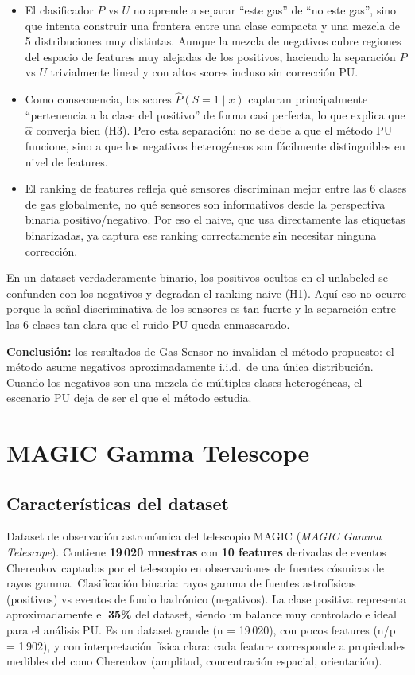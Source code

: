 \documentclass[a4paper,11pt]{article}
\begin{document}
\begin{itemize}
    \item El clasificador $P$ vs $U$ no aprende a separar ``este gas'' de ``no este gas'', sino que intenta construir una frontera entre una clase compacta y una mezcla de 5 distribuciones muy distintas. Aunque la mezcla de negativos cubre regiones del espacio de features muy alejadas de los positivos, haciendo la separación $P$ vs $U$ trivialmente lineal y con altos scores incluso sin corrección PU.
    \item Como consecuencia, los scores $\hat{P}(S=1 \mid x)$ capturan principalmente ``pertenencia a la clase del positivo'' de forma casi perfecta, lo que explica que $\hat{\alpha}$ converja bien (H3). Pero esta separación: no se debe a que el método PU funcione, sino a que los negativos heterogéneos son fácilmente distinguibles en nivel de features.
    \item El ranking de features refleja qué sensores discriminan mejor entre las 6 clases de gas globalmente, no qué sensores son informativos desde la perspectiva binaria positivo/negativo. Por eso el naive, que usa directamente las etiquetas binarizadas, ya captura ese ranking correctamente sin necesitar ninguna corrección.
\end{itemize}

En un dataset verdaderamente binario, los positivos ocultos en el unlabeled se confunden con los negativos y degradan el ranking naive (H1). Aquí eso no ocurre porque la señal discriminativa de los sensores es tan fuerte y la separación entre las 6 clases tan clara que el ruido PU queda enmascarado.

\textbf{Conclusión:} los resultados de Gas Sensor no invalidan el método propuesto: el método asume negativos aproximadamente i.i.d.\ de una única distribución. Cuando los negativos son una mezcla de múltiples clases heterogéneas, el escenario PU deja de ser el que el método estudia.

\section{MAGIC Gamma Telescope}

\subsection{Características del dataset}

Dataset de observación astronómica del telescopio MAGIC (\textit{MAGIC Gamma Telescope}). Contiene \textbf{19\,020 muestras} con \textbf{10 features} derivadas de eventos Cherenkov captados por el telescopio en observaciones de fuentes cósmicas de rayos gamma. Clasificación binaria: rayos gamma de fuentes astrofísicas (positivos) vs eventos de fondo hadrónico (negativos). La clase positiva representa aproximadamente el \textbf{35\%} del dataset, siendo un balance muy controlado e ideal para el análisis PU. Es un dataset grande (n = 19\,020), con pocos features (n/p = 1\,902), y con interpretación física clara: cada feature corresponde a propiedades medibles del cono Cherenkov (amplitud, concentración espacial, orientación).
\end{document}
